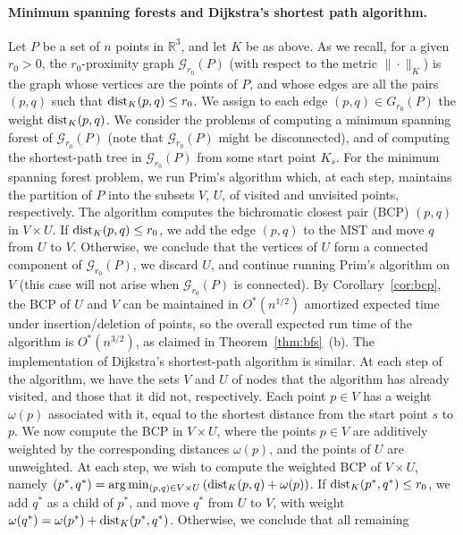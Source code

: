 \documentclass[11pt]{article}
\def\reals{{\mathbb R}}
\def\dist{{\rm dist}}
\def\G{\mathcal{G}}
\def\K{\mathcal{K}}
\theoremstyle{definition}
\begin{document}
\paragraph{Minimum spanning forests and Dijkstra's shortest path algorithm.}
\fi
%
Let $P$ be a set of $n$ points in $\reals^3$, and let $K$ be as above. As we recall,
for a given $r_0>0$, 
the $r_0$-proximity graph $\G_{r_0}(P)$ (with respect to the metric $\|\cdot\|_K$) 
is the graph whose vertices are the points of $P$, and whose
edges are all the pairs $(p,q)$ such that $\dist_K(p,q) \le r_0$. 
We assign to each edge $(p,q)\in G_{r_0}(P)$ the weight $\dist_K(p,q)$. We consider the problems 
of computing a minimum spanning forest of $\G_{r_0}(P)$ (note that $\G_{r_0}(P)$ might be disconnected), 
and of computing the shortest-path tree in $\G_{r_0}(P)$ from some start point $K_s$.
%
For the minimum spanning forest problem, 
we run Prim's algorithm which, at each step, maintains the partition of $P$
into the subsets $V$, $U$, of visited and unvisited points, respectively. The algorithm computes
the bichromatic closest pair (BCP) $(p,q)$ in $V\times U$. If $\dist_K(p,q) \le r_0$, 
we add the edge $(p,q)$ to the MST and move $q$ from $U$ to $V$. Otherwise, we
conclude that the vertices of $U$ form a connected component of $\G_{r_0} (P)$, we discard $U$, 
and continue running Prim's algorithm on $V$ (this case will not arise when $\G_{r_0}(P)$ 
is connected). By Corollary~\ref{cor:bcp}, the BCP of $U$ and $V$ can be maintained in $O^*(n^{1/2})$ 
amortized expected time under insertion/deletion of points, so the overall expected run time 
of the algorithm is $O^*(n^{3/2})$, as claimed in Theorem~\ref{thm:bfs}~(b).
%
%
The implementation of Dijkstra's shortest-path algorithm is similar.
At each step of the algorithm, we have the sets $V$ and $U$ of nodes that the algorithm has already visited, and
those that it did not, respectively. Each point $p\in V$ has a weight $\omega(p)$ associated with it, equal to
the shortest distance from the start point $s$ to $p$. We now compute the BCP in $V\times U$, where the
points $p\in V$ are additively weighted by the corresponding distances $\omega(p)$, and the points
of $U$ are unweighted. At each step, we wish to compute the weighted BCP of $V \times U$,
namely $(p^*,q^*) = \arg\min_{(p,q)\in V\times U} \left( \dist_K(p,q)+\omega(p) \right)$. 
If $\dist_K(p^*,q^*) \le r_0$, 
we add $q^*$ as a child of $p^*$, and move $q^*$ from $U$ to $V$, with weight
$\omega(q^*) = \omega(p^*) + \dist_K(p^*,q^*)$. Otherwise, we conclude that all remaining 
\end{document}
